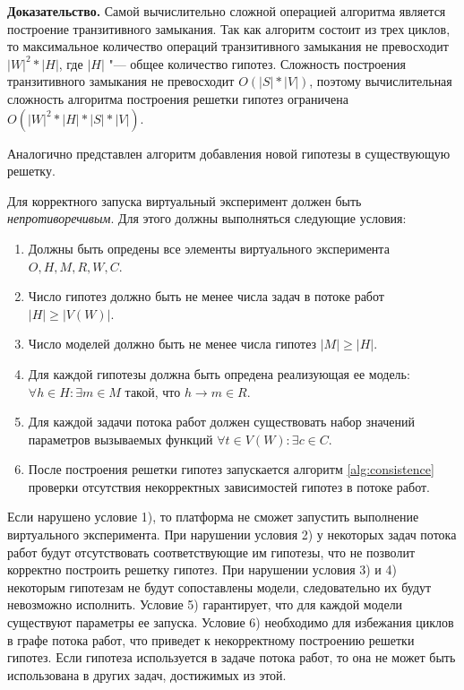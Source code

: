 \textbf{Доказательство.} Самой вычислительно сложной операцией алгоритма является построение транзитивного замыкания. 
Так как алгоритм состоит из трех циклов, то максимальное количество операций транзитивного замыкания не превосходит 
$|W|^2*|H|$, где $|H|$ "--- общее количество гипотез. Сложность построения транзитивного замыкания не превосходит 
$O\left(|S|*|V|\right)$, поэтому вычислительная сложность алгоритма построения решетки гипотез ограничена 
$O\left(|W|^2*|H|*|S|*|V|\right)$.

Аналогично представлен алгоритм добавления новой гипотезы в существующую решетку.

Для корректного запуска виртуальный эксперимент должен быть \textit{непротиворечивым}. 
Для этого должны выполняться следующие условия:
\begin{enumerate}
    \item Должны быть опредены все элементы виртуального эксперимента $O, H, M, R, W, C$.
    \item Число гипотез должно быть не менее числа задач в потоке работ $|H| \geq |V(W)| $.
    \item Число моделей должно быть не менее числа гипотез $|M| \geq |H|$.
    \item Для каждой гипотезы должна быть опредена реализующая ее модель: $ \forall h \in H: \exists m \in M$ такой, 
            что $h \rightarrow m \in R$.
    
    \item Для каждой задачи потока работ должен существовать набор значений параметров вызываемых функций 
            $ \forall t \in V(W): \exists c \in C$.
    \item После построения решетки гипотез запускается алгоритм \ref{alg:consistence} проверки отсутствия 
            некорректных зависимостей гипотез в потоке работ.
\end{enumerate}

Если нарушено условие 1), то платформа не сможет запустить выполнение виртуального эксперимента.
При нарушении условия 2) у некоторых задач потока работ будут отсутствовать соответствующие им гипотезы, что не 
позволит корректно построить решетку гипотез. При нарушении условия 3) и 4) некоторым гипотезам не будут 
сопоставлены модели, следовательно их будут невозможно исполнить. Условие 5) гарантирует, что для каждой модели 
существуют параметры ее запуска. Условие 6) необходимо для избежания циклов в графе потока работ, что приведет к 
некорректному построению решетки гипотез. Если гипотеза используется в задаче потока работ, то она не может быть 
использована в других задач, достижимых из этой. 

